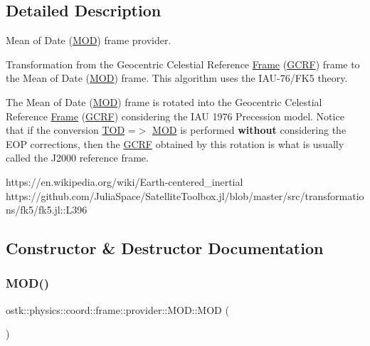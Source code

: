 \subsection{Detailed Description}
Mean of Date (\hyperlink{classostk_1_1physics_1_1coord_1_1frame_1_1provider_1_1_m_o_d}{M\+OD}) frame provider. 

Transformation from the Geocentric Celestial Reference \hyperlink{classostk_1_1physics_1_1coord_1_1_frame}{Frame} (\hyperlink{classostk_1_1physics_1_1coord_1_1frame_1_1provider_1_1_g_c_r_f}{G\+C\+RF}) frame to the Mean of Date (\hyperlink{classostk_1_1physics_1_1coord_1_1frame_1_1provider_1_1_m_o_d}{M\+OD}) frame. This algorithm uses the I\+A\+U-\/76/\+F\+K5 theory.

The Mean of Date (\hyperlink{classostk_1_1physics_1_1coord_1_1frame_1_1provider_1_1_m_o_d}{M\+OD}) frame is rotated into the Geocentric Celestial Reference \hyperlink{classostk_1_1physics_1_1coord_1_1_frame}{Frame} (\hyperlink{classostk_1_1physics_1_1coord_1_1frame_1_1provider_1_1_g_c_r_f}{G\+C\+RF}) considering the I\+AU 1976 Precession model. Notice that if the conversion {\ttfamily \hyperlink{classostk_1_1physics_1_1coord_1_1frame_1_1provider_1_1_t_o_d}{T\+OD} =$>$ \hyperlink{classostk_1_1physics_1_1coord_1_1frame_1_1provider_1_1_m_o_d}{M\+OD}} is performed {\bfseries without} considering the E\+OP corrections, then the \hyperlink{classostk_1_1physics_1_1coord_1_1frame_1_1provider_1_1_g_c_r_f}{G\+C\+RF} obtained by this rotation is what is usually called the J2000 reference frame.

https\+://en.wikipedia.\+org/wiki/\+Earth-\/centered\+\_\+inertial https\+://github.com/\+Julia\+Space/\+Satellite\+Toolbox.\+jl/blob/master/src/transformations/fk5/fk5.jl\+::\+L396 

\subsection{Constructor \& Destructor Documentation}
\mbox{\label{classostk_1_1physics_1_1coord_1_1frame_1_1provider_1_1_m_o_d_a5f10eb22a5e4522253886d39577b8620}} 
\subsubsection{\texorpdfstring{M\+O\+D()}{MOD()}}
{\footnotesize\ttfamily ostk\+::physics\+::coord\+::frame\+::provider\+::\+M\+O\+D\+::\+M\+OD (\begin{DoxyParamCaption}{ }\end{DoxyParamCaption})}

